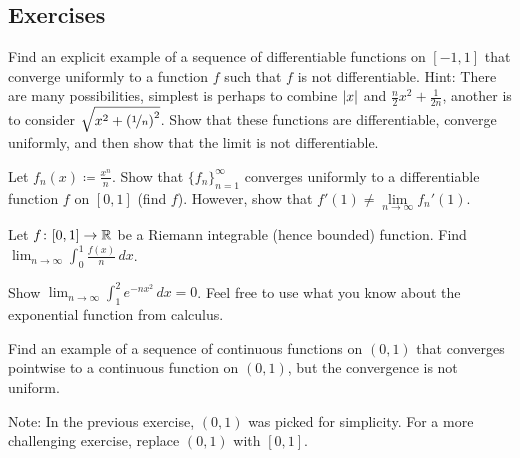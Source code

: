 \subsection{Exercises}

\begin{exercise}
Find an explicit example of a sequence of
differentiable functions on $[-1,1]$ that converge uniformly to
a function $f$ such that $f$ is not differentiable.
Hint:
There are many possibilities,
simplest is perhaps to combine $\left\lvert {x} \right\rvert$ and $\frac{n}{2}x^2 +
\frac{1}{2n}$, another is to
consider $\sqrt{x^2+{(\nicefrac{1}{n})}^2}$.  Show that these functions are differentiable,
converge uniformly, and then show that the limit is not differentiable.
\end{exercise}

\begin{exercise}
Let $f_n(x) \coloneqq \frac{x^n}{n}$.  Show that $\{ f_n \}_{n=1}^\infty$ converges uniformly to
a differentiable function $f$ on $[0,1]$ (find $f$).  However, show that
$f'(1) \not= \lim\limits_{n\to\infty} f_n'(1)$.
\end{exercise}

%
\begin{exercise}
Let $f \colon [0,1] \to {\mathbb{R}}$ be a Riemann integrable (hence bounded)
function.  Find
$\displaystyle \lim_{n\to\infty} \int_0^1 \frac{f(x)}{n} \,dx$.
\end{exercise}

\begin{exercise}
Show
$\displaystyle \lim_{n\to\infty} \int_1^2 e^{-nx^2} \,dx = 0$.  Feel free to
use
what you know about the exponential function from calculus.
\end{exercise}

\begin{exercise}
Find an example of a sequence of continuous functions on $(0,1)$ that converges 
pointwise to a continuous function on $(0,1)$, but the convergence is not
uniform.
\end{exercise}

\begin{exnote}
Note: In the previous exercise, $(0,1)$ was picked for simplicity.  For a
more challenging exercise, replace $(0,1)$ with $[0,1]$.
\end{exnote}

